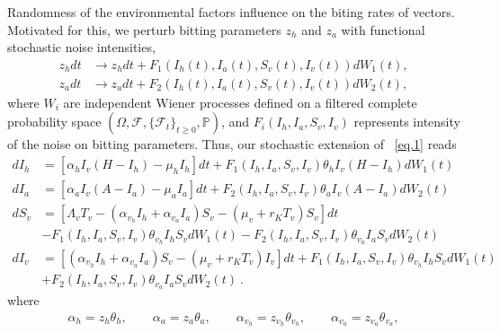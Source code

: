 
	Randomness of the environmental factors influence on the biting 
rates of vectors. Motivated for this, we perturb bitting parameters $z_{h}$ 
and $z_{a}$ with functional stochastic noise intensities,
\begin{align*}
	z_{h}dt &\rightarrow z_{h}dt +
		F_{1}\left(I_{h}(t),I_{a}(t),S_{v}(t),I_{v}(t)\right)dW_{1}(t),\\
	z_{a}dt &\rightarrow z_{a}dt + 
		F_{2}\left(I_{h}(t),I_{a}(t),S_{v}(t),I_{v}(t)\right)dW_{2}(t),
\end{align*}
where $W_{i}$ are independent Wiener processes defined on a filtered complete 
probability space 
$
	(\Omega,\mathcal{F},\{\mathcal{F}_{t}\}_{t\geq 0},\mathbb{P})
$, 
and $F_{i}\left(I_{h},I_{a},S_{v},I_{v}\right)$ represents intensity of the 
noise on bitting parameters. Thus, our stochastic extension of ~\eqref{eq.1} 
reads
\begin{equation}\label{eq.2}
	\begin{aligned}
		dI_{h} &= 
			\left[\alpha_{h}I_{v}\left(H-I_{h}\right)-\mu_{h}I_{h}\right]dt 
			+F_{1}
			\left(
				I_{h}, I_{a}, S_{v}, I_{v}
			\right)
			\theta_{h} I_{v} \left( H-I_{h}\right) dW_{1}(t)\\
		dI_{a} &= \left[\alpha_{a}I_{v}\left(A-I_{a}\right)-\mu_{a}I_{a}\right]dt 
						+ F_{2} 
							\left(
								I_{h},I_{a},S_{v},I_{v}
							\right)
							\theta_{a}I_{v}
							\left(A-I_{a}\right)dW_{2}(t)\\
		dS_{v} &= 
			\left[
				\Lambda_{v}
				T_{v}-
				\left(
					\alpha_{v_{h}}I_{h}
					+\alpha_{v_{a}} I_{a} 
				\right) S_{v}
				-\left(
					\mu_{v}+r_{K}T_{v} 
				\right) S_{v}
			\right]dt \\
		& 
		-F_{1} 
		\left(
			I_{h},I_{a},S_{v},I_{v}
		\right)
			\theta_{v_{h}}I_{h}S_{v} dW_{1}(t)
		-F_{2}
		\left(
			I_{h}, I_{a}, S_{v}, I_{v}
		\right)\theta_{v_{a}}I_{a}S_{v}dW_{2}(t)\\
		dI_{v} &= 
		\left[
			\left(\alpha_{v_{h}}I_{h}+\alpha_{v_{a}}I_{a}\right)
			S_{v}
			-\left(
				\mu_{v}+r_{K}T_{v}
			\right) I_{v}
		\right]dt 
			+ F_{1}
			\left(
				I_{h}, I_{a}, S_{v}, I_{v}
			\right)
			\theta_{v_{h}} I_{h} S_{v} dW_{1}(t)\\
			& 
			+F_{2}\left(I_{h},I_{a},S_{v},I_{v}\right)
			\theta_{v_{a}}I_{a}S_{v}dW_{2}(t) ~.
	\end{aligned}
\end{equation}
	where
\begin{align*}
	\alpha_{h}=z_{h}\theta_{h}, \qquad
	\alpha_{a}=z_{a}\theta_{a}, \qquad
	\alpha_{v_{h}}=z_{v_{h}}\theta_{v_{h}}, \qquad
	\alpha_{v_{a}}=z_{v_{a}}\theta_{v_{a}},
\end{align*}
